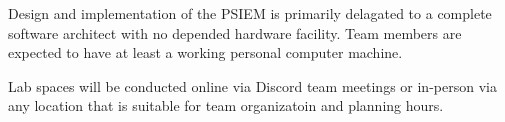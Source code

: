 Design and implementation of the PSIEM is primarily delagated to a complete software architect with no depended hardware facility. Team members are expected to have at least a working personal computer machine. 

Lab spaces will be conducted online via Discord team meetings or in-person via any location that is suitable for team organizatoin and planning hours.